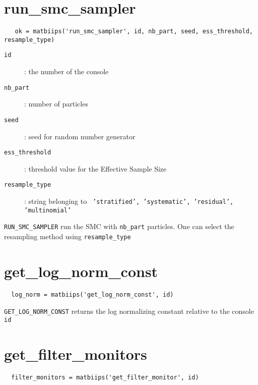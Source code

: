 \documentclass[11pt,twoside]{article}
\begin{document}
\section{run\_smc\_sampler}

 \begin{lstlisting}
   ok = matbiips('run_smc_sampler', id, nb_part, seed, ess_threshold, resample_type)
 \end{lstlisting}

   \begin{description}
     \item[\texttt{id}]: the number of the console
     \item[\texttt{nb\_part}]: number of particles
     \item[\texttt{seed}]: seed for random number generator
     \item[\texttt{ess\_threshold}]: threshold value for the Effective Sample Size
     \item[\texttt{resample\_type}]: string belonging to \texttt{ 'stratified', 'systematic', 'residual', 'multinomial' }

   \end{description}

  \texttt{RUN\_SMC\_SAMPLER} run the SMC with \texttt{nb\_part} particles. One can select the resampling method using \texttt{resample\_type}
  \section{get\_log\_norm\_const}

 \begin{lstlisting}
  log_norm = matbiips('get_log_norm_const', id)
 \end{lstlisting}
 \texttt{GET\_LOG\_NORM\_CONST} returns the log normalizing constant relative to the console \texttt{id}

 \section{get\_filter\_monitors}

 \begin{lstlisting}
  filter_monitors = matbiips('get_filter_monitor', id)
 \end{lstlisting}
\end{document}
